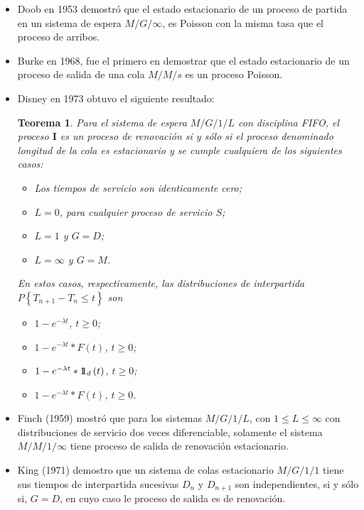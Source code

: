 \documentclass{article}
\newtheorem{Teo}{Teorema}
\newcommand{\indora}{\mbox{$1$\hspace{-0.8ex}$1$}}
\begin{document}
\begin{itemize}
\item Doob en 1953 demostr\'o que el estado estacionario de un proceso de partida en un sistema de espera $M/G/\infty$, es Poisson con la misma tasa que el proceso de arribos.

\item Burke en 1968, fue el primero en demostrar que el estado estacionario de un proceso de salida de una cola $M/M/s$ es un proceso Poisson.

\item Disney en 1973 obtuvo el siguiente resultado:

\begin{Teo}
Para el sistema de espera $M/G/1/L$ con disciplina FIFO, el proceso $\textbf{I}$ es un proceso de renovaci\'on si y s\'olo si el proceso denominado longitud de la cola es estacionario y se cumple cualquiera de los siguientes casos:

\begin{itemize}
\item[a)] Los tiempos de servicio son identicamente cero;
\item[b)] $L=0$, para cualquier proceso de servicio $S$;
\item[c)] $L=1$ y $G=D$;
\item[d)] $L=\infty$ y $G=M$.
\end{itemize}
En estos casos, respectivamente, las distribuciones de interpartida $P\left\{T_{n+1}-T_{n}\leq t\right\}$ son


\begin{itemize}
\item[a)] $1-e^{-\lambda t}$, $t\geq0$;
\item[b)] $1-e^{-\lambda t}*F\left(t\right)$, $t\geq0$;
\item[c)] $1-e^{-\lambda t}*\indora_{d}\left(t\right)$, $t\geq0$;
\item[d)] $1-e^{-\lambda t}*F\left(t\right)$, $t\geq0$.
\end{itemize}
\end{Teo}


\item Finch (1959) mostr\'o que para los sistemas $M/G/1/L$, con $1\leq L\leq \infty$ con distribuciones de servicio dos veces diferenciable, solamente el sistema $M/M/1/\infty$ tiene proceso de salida de renovaci\'on estacionario.

\item King (1971) demostro que un sistema de colas estacionario $M/G/1/1$ tiene sus tiempos de interpartida sucesivas $D_{n}$ y $D_{n+1}$ son independientes, si y s\'olo si, $G=D$, en cuyo caso le proceso de salida es de renovaci\'on.


\end{itemize}
\end{document}
